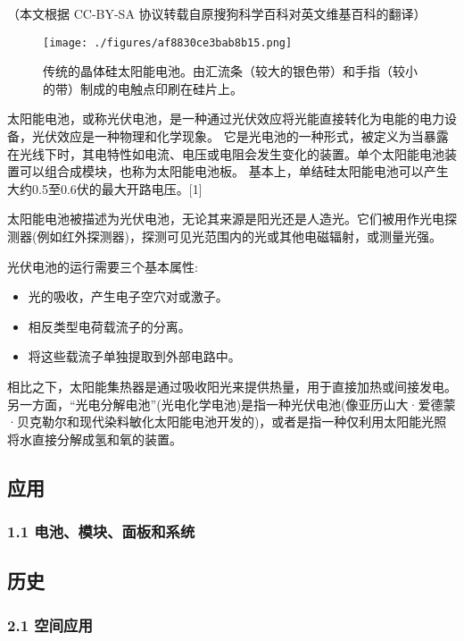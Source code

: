 
（本文根据 CC-BY-SA 协议转载自原搜狗科学百科对英文维基百科的翻译）

\begin{figure}[ht]
\centering
\texttt{[image: ./figures/af8830ce3bab8b15.png]}
\caption{传统的晶体硅太阳能电池。由汇流条（较大的银色带）和手指（较小的带）制成的电触点印刷在硅片上。} \label{fig_TYNDC_1}
\end{figure}

太阳能电池，或称光伏电池，是一种通过光伏效应将光能直接转化为电能的电力设备，光伏效应是一种物理和化学现象。 它是光电池的一种形式，被定义为当暴露在光线下时，其电特性如电流、电压或电阻会发生变化的装置。单个太阳能电池装置可以组合成模块，也称为太阳能电池板。 基本上，单结硅太阳能电池可以产生大约0.5至0.6伏的最大开路电压。[1]

太阳能电池被描述为光伏电池，无论其来源是阳光还是人造光。它们被用作光电探测器(例如红外探测器)，探测可见光范围内的光或其他电磁辐射，或测量光强。

光伏电池的运行需要三个基本属性:
\begin{itemize}
\item 光的吸收，产生电子空穴对或激子。
\item 相反类型电荷载流子的分离。
\item 将这些载流子单独提取到外部电路中。
\end{itemize}

相比之下，太阳能集热器是通过吸收阳光来提供热量，用于直接加热或间接发电。另一方面，“光电分解电池”(光电化学电池)是指一种光伏电池(像亚历山大·爱德蒙·贝克勒尔和现代染料敏化太阳能电池开发的)，或者是指一种仅利用太阳能光照将水直接分解成氢和氧的装置。

\subsection{应用}



\subsubsection{1.1 电池、模块、面板和系统}



\subsection{历史}



\subsubsection{2.1 空间应用}



